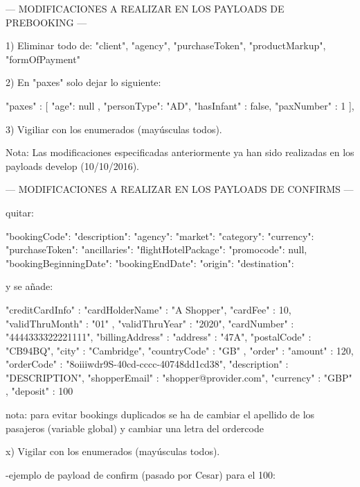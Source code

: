 --- MODIFICACIONES A REALIZAR EN LOS PAYLOADS DE PREBOOKING ---

1) Eliminar todo de:
"client", "agency", "purchaseToken", "productMarkup", "formOfPayment"

2) En "paxes" solo dejar lo siguiente:

	"paxes" : [{
		"age": null ,
		"personType": "AD",
		"hasInfant" : false,
		"paxNumber" : 1
	}],
	
	
3) Vigiliar con los enumerados (mayúsculas todos).

Nota: Las modificaciones especificadas anteriormente ya han sido realizadas en los payloads develop (10/10/2016).


--- MODIFICACIONES A REALIZAR EN LOS PAYLOADS DE CONFIRMS ---

quitar:

	"bookingCode": 
	"description": 
	"agency": 
	"market": 
	"category": 
	"currency":
	"purchaseToken": 
	"ancillaries":
	"flightHotelPackage": 
	"promocode": null,
	"bookingBeginningDate":
	"bookingEndDate": 
	"origin": 
	"destination": 
	
	
y se añade:

     "creditCardInfo" : {
     "cardHolderName" : "A Shopper",
     "cardFee" : 10,
     "validThruMonth" : "01" ,
     "validThruYear" : "2020", 
     "cardNumber" : "4444333322221111",
     "billingAddress" : {
                    "address" : "47A",
                    "postalCode" : "CB94BQ",
                    "city" : "Cambridge",
                    "countryCode" : "GB"               
                    },
     "order" : {
           "amount" : 120,
           "orderCode" : "8oiiiwdr9S-40cd-cccc-40748dd1cd38",
           "description" : "DESCRIPTION",
           "shopperEmail" : "shopper@provider.com",
           "currency" : "GBP"                       
           }        
     },
    "deposit" : 100
	
	
	nota: para evitar bookings duplicados se ha de cambiar el apellido de los pasajeros
	(variable global) y cambiar una letra del ordercode
	
	x) Vigilar con los enumerados (mayúsculas todos).
	
	

-ejemplo de payload de confirm (pasado por Cesar) para el 100:
	
	
	
